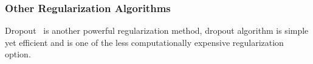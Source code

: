 \subsubsection{Other Regularization Algorithms}

Dropout~\cite{JMLR:v15:srivastava14a} is another powerful regularization method, dropout algorithm is simple yet efficient and is one of the less computationally expensive regularization option. 